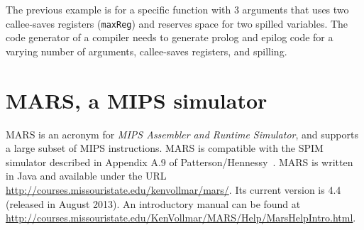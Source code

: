 \documentclass[11pt,a4paper]{article}
\begin{document}
The previous example is for a specific function with 3 arguments that uses
two callee-saves registers ({\tt maxReg}) and reserves space for two spilled
variables. The code generator of a compiler needs 
to generate prolog and epilog code for a varying number of arguments,
callee-saves registers, and spilling.
%
%
%
%
%

\section{MARS, a MIPS simulator}

MARS is an acronym for \emph{MIPS Assembler and Runtime Simulator}, and supports
a large subset of MIPS instructions. MARS is compatible with the 
SPIM simulator described in Appendix A.9 of Patterson/Hennessy~\cite{PattersonHennessy}.
MARS is written in Java and available under the URL
\url{http://courses.missouristate.edu/kenvollmar/mars/}.
Its current version is 4.4 (released in August 2013).
An introductory manual can be found at 
\url{http://courses.missouristate.edu/KenVollmar/MARS/Help/MarsHelpIntro.html}.
\end{document}

